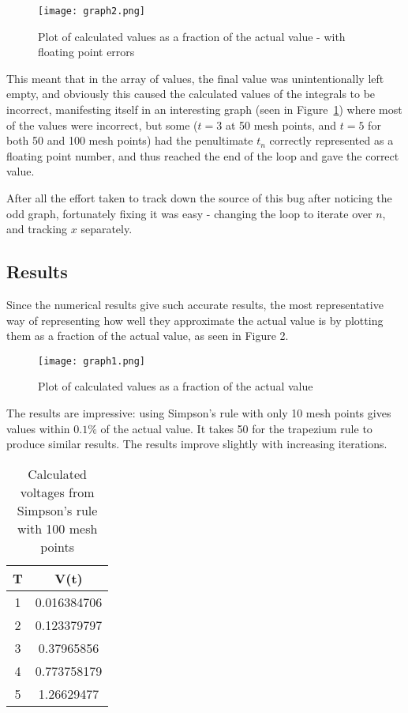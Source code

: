 \documentclass[10pt,fleqn,a4paper]{article} %
\renewcommand{\=}[1]{\stackrel{#1}{=}} %
\theoremstyle{definition}
\theoremstyle{remark}
\begin{document}
\begin{figure}[H]
\centerline{\texttt{[image: graph2.png]}}
\caption{Plot of calculated values as a fraction of the actual value - with floating point errors}
\label{fig:fig1}
\end{figure}


This meant that in the array of values, the final value was unintentionally left empty, and obviously this caused the calculated values of the integrals to be incorrect, manifesting itself in an interesting graph (seen in Figure~\ref{fig:fig1}) where most of the values were incorrect, but some ($t = 3$ at 50 mesh points, and $t=5$ for both 50 and 100 mesh points) had the penultimate $t_n$ correctly represented as a floating point number, and thus reached the end of the loop and gave the correct value.

After all the effort taken to track down the source of this bug after noticing the odd graph, fortunately fixing it was easy - changing the loop to iterate over $n$, and tracking $x$ separately.
\subsection{Results}
Since the numerical results give such accurate results, the most representative way of representing how well they approximate the actual value is by plotting them as a fraction of the actual value, as seen in Figure 2.
\begin{figure}[H]
\centerline{\texttt{[image: graph1.png]}}
\caption{Plot of calculated values as a fraction of the actual value}
\label{fig:fig2}
\end{figure}

The results are impressive: using Simpson's rule with only 10 mesh points gives values within $0.1\%$ of the actual value. It takes 50 for the trapezium rule to produce similar results. The results improve slightly with increasing iterations.

\begin{table}[htbp]
  \centering
  \caption{Calculated voltages from Simpson's rule with 100 mesh points}
    \begin{tabular}{cc}
    \toprule
    T     & V(t)  \\
    \midrule
    1     & 0.016384706 \\
    2     & 0.123379797 \\
    3     & 0.37965856 \\
    4     & 0.773758179 \\
    5     & 1.26629477 \\
    \bottomrule
    \end{tabular}%
  \label{tab:taskb}%
\end{table}
\end{document}
